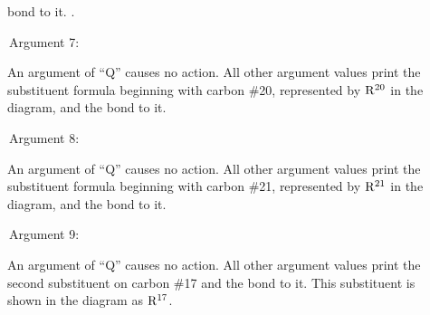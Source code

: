 \begin{description}
      bond to it.
      \ri .
 \item[{\rm \ \ \ \ \ \ Argument 7:}] An argument of ``Q''
      causes no action. All other argument values print
      the substituent formula beginning with carbon \#20,
      represented by ${\rm R^{20}}$ in the diagram, and the
      bond to it.
 \item[{\rm \ \ \ \ \ \ Argument 8:}] An argument of ``Q''
      causes no action. All other argument values print
      the substituent formula beginning with carbon \#21,
      represented by ${\rm R^{21}}$ in the diagram,
      and the bond to it.
 \item[{\rm \ \ \ \ \ \ Argument 9:}] An argument of ``Q''
      causes no action. All other argument values print
      the second substituent on carbon \#17 and the bond 
      to it. This substituent is shown in the diagram
      as ${\rm R^{17}}$.
 \end{description}


 







